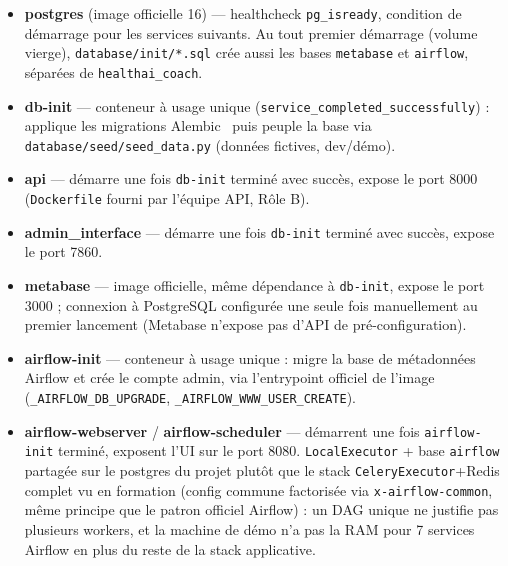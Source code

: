 \documentclass{article}
\begin{document}
\begin{itemize}[leftmargin=1.4em]
  \item \textbf{postgres} (image officielle 16) — healthcheck \texttt{pg\_isready}, condition de démarrage pour les services suivants. Au tout premier démarrage (volume vierge), \texttt{database/init/*.sql} crée aussi les bases \texttt{metabase} et \texttt{airflow}, séparées de \texttt{healthai\_coach}.
  \item \textbf{db-init} — conteneur à usage unique (\texttt{service\_completed\_successfully}) : applique les migrations Alembic~\citep{alembic} puis peuple la base via \texttt{database/seed/seed\_data.py} (données fictives, dev/démo).
  \item \textbf{api} — démarre une fois \texttt{db-init} terminé avec succès, expose le port 8000 (\texttt{Dockerfile} fourni par l'équipe API, Rôle B).
  \item \textbf{admin\_interface} — démarre une fois \texttt{db-init} terminé avec succès, expose le port 7860.
  \item \textbf{metabase} — image officielle, même dépendance à \texttt{db-init}, expose le port 3000 ; connexion à PostgreSQL configurée une seule fois manuellement au premier lancement (Metabase n'expose pas d'API de pré-configuration).
  \item \textbf{airflow-init} — conteneur à usage unique : migre la base de métadonnées Airflow et crée le compte admin, via l'entrypoint officiel de l'image (\texttt{\_AIRFLOW\_DB\_UPGRADE}, \texttt{\_AIRFLOW\_WWW\_USER\_CREATE}).
  \item \textbf{airflow-webserver} / \textbf{airflow-scheduler} — démarrent une fois \texttt{airflow-init} terminé, exposent l'UI sur le port 8080. \texttt{LocalExecutor} + base \texttt{airflow} partagée sur le postgres du projet plutôt que le stack \texttt{CeleryExecutor}+Redis complet vu en formation (config commune factorisée via \texttt{x-airflow-common}, même principe que le patron officiel Airflow) : un DAG unique ne justifie pas plusieurs workers, et la machine de démo n'a pas la RAM pour 7 services Airflow en plus du reste de la stack applicative.
\end{itemize}
\end{document}
